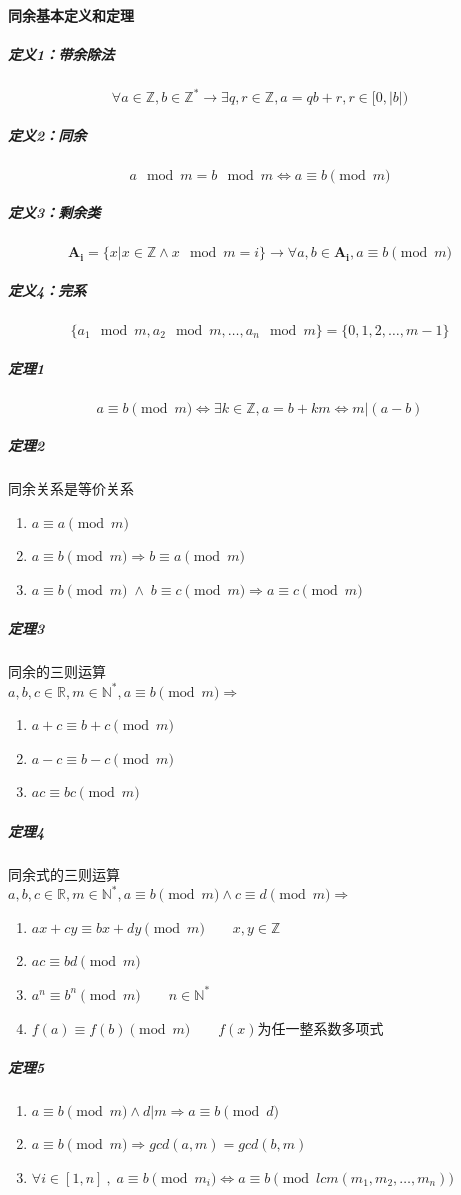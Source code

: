 \documentclass[]{cpp}
\begin{document}
\paragraph{同余基本定义和定理}
\subparagraph{定义1：带余除法}
	$$\forall a\in\mathbb{Z},b\in\mathbb{Z^{*}}\to\exists q,r\in\mathbb{Z},a=qb+r,r\in [0,|b|)$$
\subparagraph{定义2：同余}
	$$a\!\!\!\!\mod m = b\!\!\!\!\mod m \iff a\equiv b\!\!\!\!\pmod{m}$$
\subparagraph{定义3：剩余类}
	$$\mathbf{A_i}=\{x|x\in\mathbb{Z}\land x\!\!\!\!\mod{m} = i\}\to\forall a,b\in\mathbf{A_i},a\equiv b\!\!\!\!\pmod{m}$$
\subparagraph{定义4：完系}
	$$\{a_1\!\!\!\!\mod m,a_2\!\!\!\!\mod m,\ldots,a_n\!\!\!\!\mod m\}=\{0,1,2,\ldots,m-1\}$$
\subparagraph{定理1}
	$$a\equiv b\!\!\!\!\pmod{m}\iff\exists k\in\mathbb{Z},a=b+km\iff m|(a-b)$$
\subparagraph{定理2} 同余关系是等价关系
	\begin{enumerate}
		\item $a\equiv a\pmod{m}$
		\item $a\equiv b\pmod{m}\Rightarrow b\equiv a\pmod{m}$
		\item $a\equiv b\pmod{m} \;\land\; b\equiv c\pmod{m}\Rightarrow a\equiv c\pmod{m}$
	\end{enumerate}
\subparagraph{定理3} 同余的三则运算\\
	$a,b,c\in\mathbb{R},m\in\mathbb{N^*}, a\equiv b\pmod{m} \Rightarrow$
	\begin{enumerate}
		\item $a+c\equiv b+c\pmod{m}$
		\item $a-c\equiv b-c\pmod{m}$
		\item $ac\equiv bc\pmod{m}$
	\end{enumerate}
\subparagraph{定理4} 同余式的三则运算\\
	$a,b,c\in\mathbb{R},m\in\mathbb{N^*}, a\equiv b\pmod{m} \land c\equiv d\pmod{m} \Rightarrow$
	\begin{enumerate}
		\item $ax+cy\equiv bx+dy\pmod{m}\qquad x,y\in\mathbb{Z}$
		\item $ac\equiv bd\pmod{m}$
		\item $a^n\equiv b^n\pmod{m}\qquad n\in\mathbb{N^*}$
		\item $f(a)\equiv f(b)\pmod{m}\qquad f(x)$为任一整系数多项式
	\end{enumerate}
\subparagraph{定理5}
	\begin{enumerate}
		\item $a\equiv b\pmod{m}\land d|m \Rightarrow a\equiv b\pmod{d}$
		\item $a\equiv b\pmod{m}\Rightarrow gcd(a,m)=gcd(b,m)$
		\item $\forall i \in [1,n]\ ,\;a\equiv b\pmod{m_i} \iff a\equiv b\pmod{lcm(m_1,m_2,\ldots,m_n)}$
	\end{enumerate}
\end{document}
